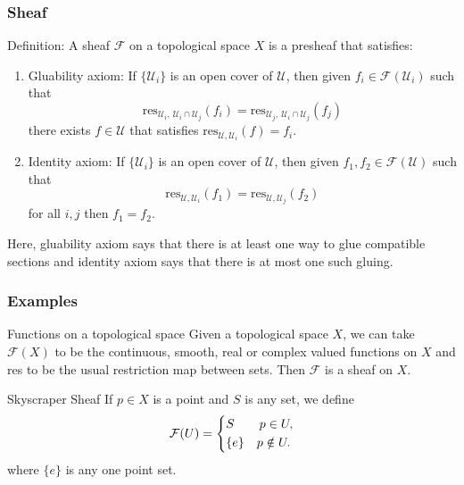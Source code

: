 \documentclass{beamer}
\begin{document}

\begin{frame}
    \frametitle{Sheaf}
    Definition: A sheaf $\mathcal{F}$ on a topological space $X$
    is a presheaf that satisfies:
    \begin{enumerate}
        \item Gluability axiom: If $\{\mathcal{U}_i\}$ is an open cover of $\mathcal{U}$,
            then given $f_i\in \mathcal{F}(\mathcal{U}_i)$ such that
            $$\text{res}_{\mathcal{U}_i,\ \mathcal{U}_i\cap\mathcal{U}_j}(f_i)=
            \text{res}_{\mathcal{U}_j,\ \mathcal{U}_i\cap\mathcal{U}_j}(f_j)$$
            there exists $f\in \mathcal{U}$ that satisfies $\text{res}_{\mathcal{U},\mathcal{U}_i}
            (f)=f_i$.
    
        \item Identity axiom: If $\{\mathcal{U}_i\}$ is an open cover of $\mathcal{U}$,
            then given $f_1, f_2\in \mathcal{F}(\mathcal{U})$ such that
            $$\text{res}_{\mathcal{U},\mathcal{U}_i}(f_1)=
            \text{res}_{\mathcal{U},\mathcal{U}_j}(f_2)$$
            for all $i, j$ then $f_1 = f_2$.
    \end{enumerate}
    Here, gluability axiom says that there is at least one way to glue compatible sections
    and identity axiom says that there is at most one such gluing.
    
    \end{frame}
    

\begin{frame}
    \frametitle{Examples}

    \begin{block}{Functions on a topological space}
        Given a topological space $X$, we can take $\mathcal{F}(X)$ to be the continuous,
        smooth, real or complex valued functions on $X$ and res to be the usual restriction
        map between sets. Then $\mathcal{F}$ is a sheaf on $X$.
    \end{block}

    \begin{block}{Skyscraper Sheaf}
        If $p\in X$ is a point and $S$ is any set, we define
        $$\mathcal{F}(U)=\begin{dcases}
            S \quad \ \ \ p\in U,\\
            \{e\}\quad p\notin U.
        \end{dcases}$$
        where $\{e\}$ is any one point set.
    \end{block}

\end{frame}
    
\end{document}
